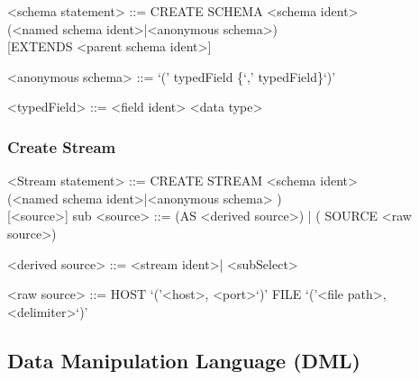 \setlength{\grammarindent}{12em} %

\begin{grammar}

<schema statement> ::= CREATE SCHEMA <schema ident> \\
(<named schema ident>|<anonymous schema>) \\
  { }[EXTENDS <parent schema ident>]

<anonymous schema> ::= `(' typedField \{`,' typedField\}`)'

<typedField> ::= <field ident> <data type>

\end{grammar}
	
	




\subsubsection{Create Stream}
	
					
\begin{grammar}
<Stream statement> ::= CREATE STREAM <schema ident> \\		(<named schema ident>|<anonymous schema> ) \\
{ }[<source>]
sub
<source> ::= (AS <derived source>) | ( SOURCE <raw source>)

<derived source> ::=  <stream ident>| <subSelect>

<raw source> ::= 
				HOST `('<host>, <port>`)'
					\alt FILE `('<file path>, <delimiter>`)'
\end{grammar}


\subsection{Data Manipulation Language (DML)}

